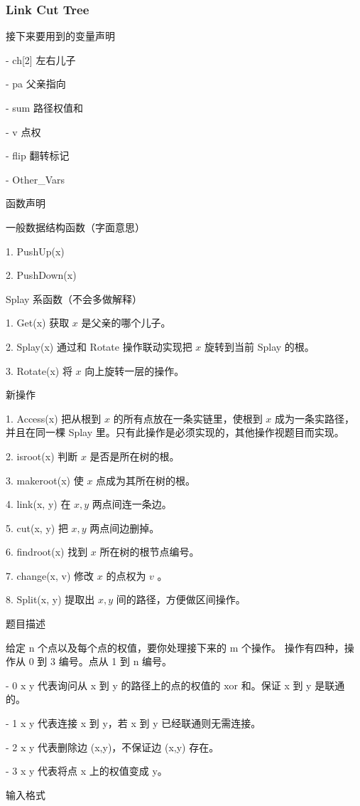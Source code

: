 \documentclass[UTF8]{ctexart}
\begin{document}
\subsubsection{Link Cut Tree}
接下来要用到的变量声明

- ch[2] 左右儿子

- pa 父亲指向

- sum 路径权值和

- v 点权

- flip 翻转标记

- Other\_Vars

函数声明

一般数据结构函数（字面意思）

1. PushUp(x)

2. PushDown(x)

Splay 系函数（不会多做解释）

1. Get(x) 获取 $x$ 是父亲的哪个儿子。

2. Splay(x) 通过和 Rotate 操作联动实现把 $x$ 旋转到当前 Splay 的根。

3. Rotate(x) 将 $x$ 向上旋转一层的操作。

新操作

1. Access(x) 把从根到 $x$ 的所有点放在一条实链里，使根到 $x$ 成为一条实路径，并且在同一棵 Splay 里。只有此操作是必须实现的，其他操作视题目而实现。

2. isroot(x) 判断 $x$ 是否是所在树的根。

3. makeroot(x) 使 $x$ 点成为其所在树的根。

4. link(x, y) 在 $x, y$ 两点间连一条边。

5. cut(x, y) 把 $x, y$ 两点间边删掉。

6. findroot(x) 找到 $x$ 所在树的根节点编号。

7. change(x, v) 修改 $x$ 的点权为 $v$ 。

8. Split(x, y) 提取出 $x, y$ 间的路径，方便做区间操作。

题目描述

给定 n 个点以及每个点的权值，要你处理接下来的 m 个操作。
操作有四种，操作从 0 到 3 编号。点从 1 到 n 编号。

- 0 x y 代表询问从 x 到 y 的路径上的点的权值的 $\text{xor}$ 和。保证 x 到 y 是联通的。

- 1 x y 代表连接 x 到 y，若 x 到 y 已经联通则无需连接。

- 2 x y 代表删除边 (x,y)，不保证边 (x,y) 存在。

- 3 x y 代表将点 x 上的权值变成 y。

输入格式
\end{document}

